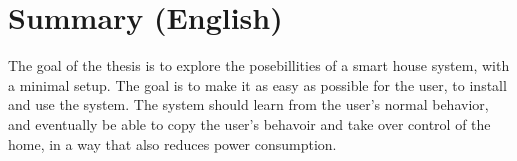 \chapter{Summary (English)}

	The goal of the thesis is to explore the posebillities of a smart house system, with a minimal setup. The goal is to make it as easy as possible for the user, to install and use the system. The system should learn from the user's normal behavior, and eventually be able to copy the user's behavoir and take over control of the home, in a way that also reduces power consumption.
